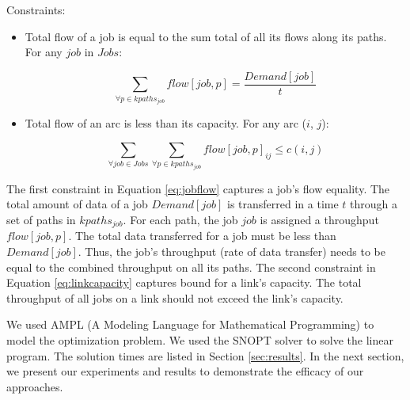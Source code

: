 Constraints:
\begin{itemize}

\item Total flow of a job is equal to the sum total of all its flows along its paths. For any $job$ in $Jobs$: 

\begin{equation} 
\label{eq:jobflow}
\sum_{\forall p \in kpaths_{job}} flow[job, p]  = \frac{Demand[job]}{t}
\end{equation}

\item Total flow of an arc is less than its capacity. For any arc ($i$, $j$):

\begin{equation} 
\label{eq:linkcapacity}
\sum_{\forall job \in Jobs}\sum_{\forall p \in kpaths_{job}} flow[job, p]_{ij} \leq c(i, j)
\end{equation}

\end{itemize}

%

The first constraint in Equation \ref{eq:jobflow} captures a job's flow equality. The total amount of data of a job $Demand[job]$ is transferred in a time $t$ through a set of paths in $kpaths_{job}$. For each path, the job $job$ is assigned a throughput $flow[job, p]$. The total data transferred for a job must be less than $Demand[job]$. Thus, the job's throughput (rate of data transfer) needs to be equal to the combined throughput on all its paths. The second constraint in Equation \ref{eq:linkcapacity} captures bound for a link's capacity. The total throughput of all jobs on a link should not exceed the link's capacity.

We used AMPL (A Modeling Language for Mathematical Programming) \cite{ampl-book} to model the optimization problem. We used the SNOPT solver to solve the linear program. The solution times are listed in Section \ref{sec:results}. In the next section, we present our experiments and results to demonstrate the efficacy of our approaches.

